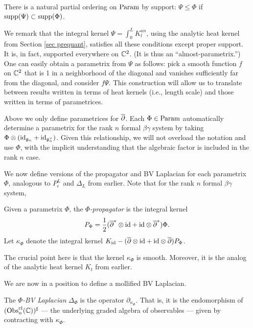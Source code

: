 There is a natural partial ordering on ${\rm Param}$ by support:
$\Psi \leq \Phi$ if ${\rm supp}(\Psi) \subset {\rm supp}(\Phi)$.

We remark that the integral kernel $\Psi = \int_0^L K_t^{an}$, using the analytic heat kernel from Section \ref{sec prequant},
satisfies all these conditions except proper support. 
It is, in fact, supported everywhere on $\mathbb C^2$.
(It is thus an ``almost-parametrix.'')
One can easily obtain a parametrix from $\Psi$ as follows: 
pick a smooth function $f$ on $\mathbb C^2$ that is 1 in a neighborhood of the diagonal and vanishes sufficiently far from the diagonal,
and consider $f \Psi$.
This construction will allow us to translate between results written in terms of heat kernels (i.e., length scale)
and those written in terms of parametrices.

\begin{rmk}
Above we only define parametrices for $\overline{\partial}$. 
Each $\Phi \in {\rm Param}$ automatically determine a parametrix for the rank $n$ formal $\beta\gamma$ system
by taking $\Phi \otimes ({\rm id}_{\mathfrak{g}_n} + {\rm id}_{\mathfrak{g}_n^\vee})$.
Given this relationship, we will not overload the notation and use $\Phi$, 
with the implicit understanding that the algebraic factor is included in the rank $n$ case.
\end{rmk}

We now define versions of the propagator and BV Laplacian for each parametrix $\Phi$,
analogous to $P_\epsilon^L$ and $\Delta_L$ from earlier.
Note that for the rank $n$ formal $\beta\gamma$ system, 

\begin{dfn}
Given a parametrix $\Phi$, the \emph{$\Phi$-propagator} is the integral kernel
\[
P_{\Phi}=\frac{1}{2} (\overline{\partial}^* \otimes {\rm id} + {\rm id} \otimes \overline{\partial}^*)\Phi.
\]
Let $\kappa_\Phi$ denote the integral kernel $K_{\rm id} - (\overline{\partial} \otimes {\rm id} + {\rm id} \otimes \overline{\partial})P_\Phi$.
\end{dfn}

The crucial point here is that the kernel $\kappa_\Phi$ is smooth. Moreover, it is the analog of the analytic heat kernel $K_t$ from earlier.

We are now in a position to define a mollified BV Laplacian.

\begin{dfn}
The \emph{$\Phi$-BV Laplacian} $\Delta_\Phi$ is the operator $\partial_{\kappa_\Phi}$.
That is, it is the endomorphism of $({\rm Obs}^{\rm cl}_n(\mathbb C))^\sharp$ --- the underlying graded algebra of observables --- given by contracting with $\kappa_\Phi$. 
\end{dfn}

